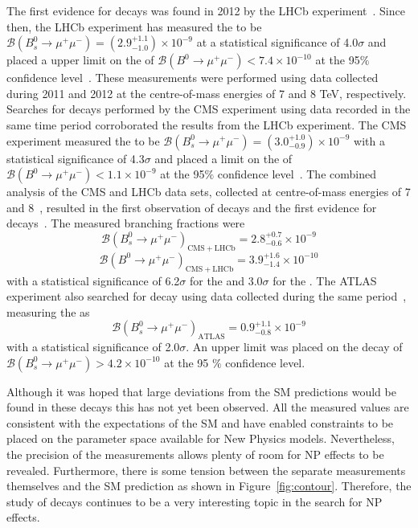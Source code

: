 The first evidence for \bsmumu decays was found in 2012 by the LHCb experiment~\cite{Aaij:2012nna}. Since then,
the LHCb experiment has measured the \bsmumu \BF to be $\mathcal{B}(B^{0}_{s} \to \mu^+ \mu^-) = (2.9^{+1.1}_{-1.0})\times 10^{-9}$ at a statistical significance of 4.0$\sigma$ and placed a upper limit on the \bdmumu \BF of $\mathcal{B}(B^{0} \to \mu^+ \mu^-) < 7.4 \times 10^{-10}$ at the 95$\%$ confidence level~\cite{Aaij:2013aka}. These measurements were performed using data collected during 2011 and 2012 at the centre-of-mass energies of 7 and 8 TeV, respectively. Searches for \bmumu decays performed by the CMS experiment using data recorded in the same time period corroborated the results from the LHCb experiment. The CMS experiment measured the \bsmumu \BF to be $\mathcal{B}(B^{0}_{s} \to \mu^+ \mu^-) = (3.0^{+1.0}_{-0.9})\times 10^{-9}$ with a statistical significance of 4.3$\sigma$ and placed a limit on the \bdmumu \BF of $\mathcal{B}(B^{0} \to \mu^+ \mu^-) < 1.1 \times 10^{-9}$ at the 95$\%$ confidence level~\cite{Chatrchyan:2013bka}. 
The combined analysis of the CMS and LHCb data sets, collected at centre-of-mass energies of 7 and 8~\tev, resulted in the first observation of \bsmumu decays and the first evidence for \bdmumu decays~\cite{CMS:2014xfa}. The measured branching fractions were 
\begin{equation}
\mathcal{B}(B^{0}_{s} \to \mu^+ \mu^-)_{\mathrm{CMS + LHCb}}  = 2.8^{+0.7}_{-0.6} \times 10^{-9}
\end{equation}
\begin{equation}
\mathcal{B}(B^{0} \to \mu^+ \mu^-)_{\mathrm{CMS + LHCb}}  = 3.9^{+1.6}_{-1.4} \times 10^{-10}
\end{equation}
with a statistical significance of 6.2$\sigma$ for the \bs and 3.0$\sigma$ for the \bd. The ATLAS experiment also searched for \bmumu decay using data collected during the same period~\cite{Aaboud:2016ire}, measuring the \bsmumu \BF as 
\begin{equation}
\mathcal{B}(B^{0}_{s} \to \mu^+ \mu^-)_{\mathrm{ATLAS}}  = 0.9^{+1.1}_{-0.8} \times 10^{-9}
\end{equation}
with a statistical significance of 2.0$\sigma$. An upper limit was placed on the \bdmumu decay of $\mathcal{B}(B^{0}_{s} \to \mu^+ \mu^-) >4.2 \times 10^{-10}$ at the 95 $\%$ confidence level.

Although it was hoped that large deviations from the SM predictions would be found in these decays this has not yet been observed. 
All the measured values are consistent with the expectations of the SM and have enabled constraints to be placed on the parameter space available for New Physics models. Nevertheless, the precision of the measurements allows plenty of room for NP effects to be revealed. Furthermore, there is some tension between the separate measurements themselves and the SM prediction as shown in Figure~\ref{fig:contour}. Therefore, the study of \bmumu decays continues to be a very interesting topic in the search for NP effects. 
 
